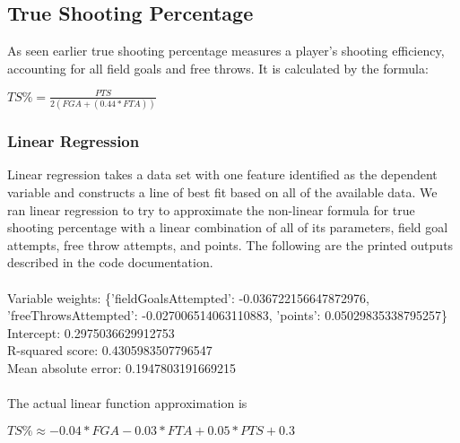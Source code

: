 \documentclass{article}
\begin{document}
\subsection{True Shooting Percentage}
As seen earlier true shooting percentage measures a player’s shooting efficiency, accounting for all field goals and free throws. It is calculated by the formula:
\begin{center}
    $TS\%=\frac{PTS}{2(FGA+(0.44*FTA))}$
\end{center}
\subsubsection*{Linear Regression}
Linear regression takes a data set with one feature identified as the dependent variable and constructs a line of best fit based on all of the available data. We ran linear regression to try to approximate the non-linear formula for true shooting percentage with a linear combination of all of its parameters, field goal attempts, free throw attempts, and points. The following are the printed outputs described in the code documentation.\\ \\
Variable weights: \{'fieldGoalsAttempted': -0.036722156647872976, 'freeThrowsAttempted': -0.027006514063110883, 'points': 0.05029835338795257\}\\
Intercept: 0.2975036629912753\\
R-squared score: 0.4305983507796547\\
Mean absolute error: 0.1947803191669215\\ \\
The actual linear function approximation is\\
\begin{center}
    $TS\%\approx -0.04*FGA-0.03*FTA+0.05*PTS+0.3$
\end{center}
\end{document}
